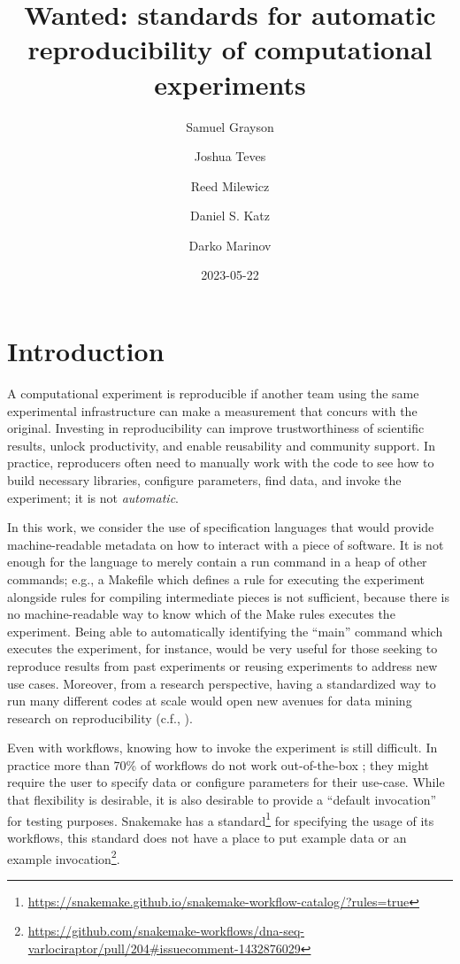 \documentclass[manuscript,authordraft]{acmart}
\title{Wanted: standards for automatic reproducibility of computational
experiments}
\author{Samuel Grayson}
\affiliation{%
    \institution{University of Illinois Urbana-Champaign}%
    \department{Department of Computer Science}%
    \streetaddress{201 North Goodwin Avenue MC 258}%
    \city{Urbana}%
    \state{IL}%
    \postcode{61801-2302}%
    \country{USA}%
    }
\author{Joshua Teves}
\affiliation{%
    \institution{Sandia National Laboratories}%
    \department{Software Engineering and Research Department}%
    \streetaddress{1515 Eubank Blvd SE1515 Eubank Blvd SE}%
    \city{Albuquerque}%
    \state{NM}%
    \postcode{87123}%
    \country{USA}%
    }
\author{Reed Milewicz}
\affiliation{%
    \institution{Sandia National Laboratories}%
    \department{Software Engineering and Research Department}%
    \streetaddress{1515 Eubank Blvd SE1515 Eubank Blvd SE}%
    \city{Albuquerque}%
    \state{NM}%
    \postcode{87123}%
    \country{USA}%
    }
\author{Daniel S. Katz}
\affiliation{%
    \institution{University of Illinois Urbana-Champaign Department of
Computer Science}%
    \department{Department of Computer Science}%
    \streetaddress{201 North Goodwin Avenue MC 258}%
    \city{Urbana}%
    \state{IL}%
    \postcode{61801-2302}%
    \country{USA}%
    }
\author{Darko Marinov}
\affiliation{%
    \institution{University of Illinois Urbana-Champaign}%
    \department{Department of Computer Science}%
    \streetaddress{201 North Goodwin Avenue MC 258}%
    \city{Urbana}%
    \state{IL}%
    \postcode{61801-2302}%
    \country{USA}%
    }
\date{2023-05-22}
\begin{document}
\maketitle

\renewcommand{\shortauthors}{Grayson et al.}


\hypertarget{introduction}{%
\section{Introduction}\label{introduction}}

A computational experiment is reproducible if another team using the
same experimental infrastructure can make a measurement that concurs
with the original. Investing in reproducibility can improve
trustworthiness of scientific results, unlock productivity, and enable
reusability and community support\cite{ivie2018reproducibility}. In
practice, reproducers often need to manually work with the code to see
how to build necessary libraries, configure parameters, find data, and
invoke the experiment; it is not \emph{automatic}.

In this work, we consider the use of specification languages that would
provide machine-readable metadata on how to interact with a piece of
software. It is not enough for the language to merely contain a run
command in a heap of other commands; e.g., a Makefile which defines a
rule for executing the experiment alongside rules for compiling
intermediate pieces is not sufficient, because there is no
machine-readable way to know which of the Make rules executes the
experiment. Being able to automatically identifying the ``main'' command
which executes the experiment, for instance, would be very useful for
those seeking to reproduce results from past experiments or reusing
experiments to address new use cases. Moreover, from a research
perspective, having a standardized way to run many different codes at
scale would open new avenues for data mining research on reproducibility
(c.f., \cite{collberg_repeatability_2016}).

Even with workflows, knowing how to invoke the experiment is still
difficult. In practice more than 70\% of workflows do not work
out-of-the-box ; they might require the user to specify data or
configure parameters for their use-case. While that flexibility is
desirable, it is also desirable to provide a ``default invocation'' for
testing purposes. Snakemake has a standard\footnote{\url{https://snakemake.github.io/snakemake-workflow-catalog/?rules=true}}
for specifying the usage of its workflows, this standard does not have a
place to put example data or an example invocation\footnote{\url{https://github.com/snakemake-workflows/dna-seq-varlociraptor/pull/204\#issuecomment-1432876029}}.
\end{document}
